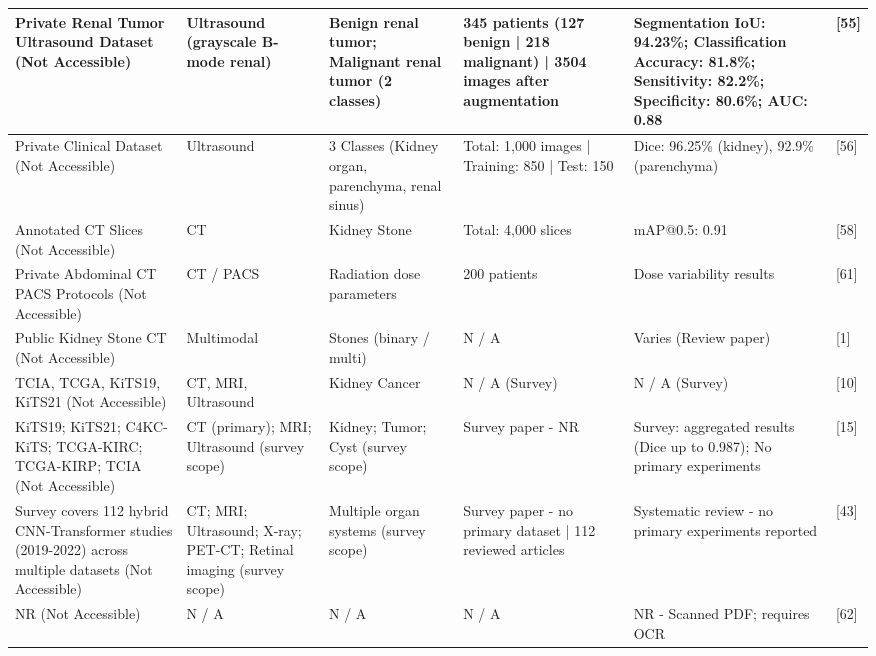 \documentclass{article}
\begin{document}
\begin{longtable}{|L{3.0cm}|L{1.8cm}|L{2.5cm}|L{3.2cm}|L{4.2cm}|L{1.8cm}|}
\hline
Private Renal Tumor Ultrasound Dataset (Not Accessible) & Ultrasound (grayscale B-mode renal) & Benign renal tumor; Malignant renal tumor (2 classes) & 345 patients (127 benign | 218 malignant) | 3504 images after augmentation & Segmentation IoU: 94.23\%; Classification Accuracy: 81.8\%; Sensitivity: 82.2\%; Specificity: 80.6\%; AUC: 0.88 & [55] \\
\hline
Private Clinical Dataset (Not Accessible) & Ultrasound & 3 Classes (Kidney organ, parenchyma, renal sinus) & Total: 1,000 images | Training: 850 | Test: 150 & Dice: 96.25\% (kidney), 92.9\% (parenchyma) & [56] \\
\hline
Annotated CT Slices (Not Accessible) & CT & Kidney Stone & Total: 4,000 slices & mAP@0.5: 0.91 & [58] \\
\hline
Private Abdominal CT PACS Protocols (Not Accessible) & CT / PACS & Radiation dose parameters & 200 patients & Dose variability results & [61] \\
\hline
Public Kidney Stone CT (Not Accessible) & Multimodal & Stones (binary / multi) & N / A & Varies (Review paper) & [1] \\
\hline
TCIA, TCGA, KiTS19, KiTS21 (Not Accessible) & CT, MRI, Ultrasound & Kidney Cancer & N / A (Survey) & N / A (Survey) & [10] \\
\hline
KiTS19; KiTS21; C4KC-KiTS; TCGA-KIRC; TCGA-KIRP; TCIA (Not Accessible) & CT (primary); MRI; Ultrasound (survey scope) & Kidney; Tumor; Cyst (survey scope) & Survey paper - NR & Survey: aggregated results (Dice up to 0.987); No primary experiments & [15] \\
\hline
Survey covers 112 hybrid CNN-Transformer studies (2019-2022) across multiple datasets (Not Accessible) & CT; MRI; Ultrasound; X-ray; PET-CT; Retinal imaging (survey scope) & Multiple organ systems (survey scope) & Survey paper - no primary dataset | 112 reviewed articles & Systematic review - no primary experiments reported & [43] \\
\hline
NR (Not Accessible) & N / A & N / A & N / A & NR - Scanned PDF; requires OCR & [62] \\

\end{longtable}
\end{document}
